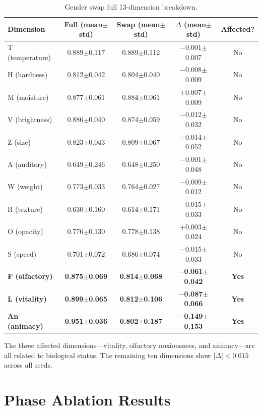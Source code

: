 \documentclass{article}
\begin{document}
\begin{table}[htbp]
\centering
\small
\caption{Gender swap full 13-dimension breakdown.}
\label{tab:genderswap_full}
\begin{tabular}{lcccc}
\toprule
Dimension & Full (mean$\pm$std) & Swap (mean$\pm$std) & $\Delta$ (mean$\pm$std) & Affected? \\
\midrule
T (temperature) & 0.889$\pm$0.117 & 0.889$\pm$0.112 & $-$0.001$\pm$0.007 & No \\
H (hardness) & 0.812$\pm$0.042 & 0.804$\pm$0.040 & $-$0.008$\pm$0.009 & No \\
M (moisture) & 0.877$\pm$0.061 & 0.884$\pm$0.061 & +0.007$\pm$0.009 & No \\
V (brightness) & 0.886$\pm$0.040 & 0.874$\pm$0.059 & $-$0.012$\pm$0.032 & No \\
Z (size) & 0.823$\pm$0.043 & 0.809$\pm$0.067 & $-$0.014$\pm$0.052 & No \\
A (auditory) & 0.649$\pm$0.246 & 0.648$\pm$0.250 & $-$0.001$\pm$0.048 & No \\
W (weight) & 0.773$\pm$0.033 & 0.764$\pm$0.027 & $-$0.009$\pm$0.012 & No \\
R (texture) & 0.630$\pm$0.160 & 0.614$\pm$0.171 & $-$0.015$\pm$0.033 & No \\
O (opacity) & 0.776$\pm$0.130 & 0.778$\pm$0.138 & +0.003$\pm$0.024 & No \\
S (speed) & 0.701$\pm$0.072 & 0.686$\pm$0.074 & $-$0.015$\pm$0.033 & No \\
\textbf{F (olfactory)} & \textbf{0.875$\pm$0.069} & \textbf{0.814$\pm$0.068} & \textbf{$-$0.061$\pm$0.042} & \textbf{Yes} \\
\textbf{L (vitality)} & \textbf{0.899$\pm$0.065} & \textbf{0.812$\pm$0.106} & \textbf{$-$0.087$\pm$0.066} & \textbf{Yes} \\
\textbf{An (animacy)} & \textbf{0.951$\pm$0.036} & \textbf{0.802$\pm$0.187} & \textbf{$-$0.149$\pm$0.153} & \textbf{Yes} \\
\bottomrule
\end{tabular}
\end{table}

The three affected dimensions---vitality, olfactory noxiousness, and animacy---are all related to biological status. The remaining ten dimensions show $|\Delta| < 0.015$ across all seeds.

\section{Phase Ablation Results}
\end{document}
